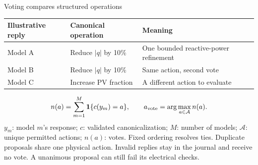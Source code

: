 \begin{frame}[t]{Voting compares structured operations}
\deepdive
\fontsize{8.5}{10}\selectfont
\begin{tabular}{@{}p{.21\linewidth}p{.29\linewidth}p{.40\linewidth}@{}}
\toprule Illustrative reply & Canonical operation & Meaning \\
\midrule
Model A & Reduce $|q|$ by 10\% & One bounded reactive-power refinement \\
Model B & Reduce $|q|$ by 10\% & Same action, second vote \\
Model C & Increase PV fraction & A different action to evaluate \\
\bottomrule
\end{tabular}\par
\[
n(a)=\sum_{m=1}^{M}\mathbf1\{c(y_m)=a\},\qquad
a_{\rm vote}=\arg\max_{a\in\mathcal A} n(a).
\]
$y_m$: model $m$'s response; $c$: validated canonicalization; $M$: number of models; $\mathcal A$: unique permitted actions; $n(a)$: votes. Fixed ordering resolves ties.
\medskip
Duplicate proposals share one physical action. Invalid replies stay in the journal and receive no vote. A unanimous proposal can still fail its electrical checks.
\end{frame}

